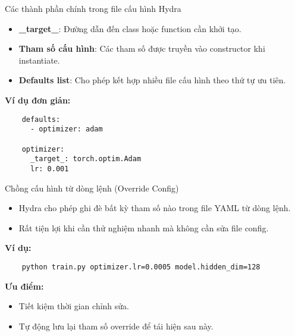 \documentclass{beamer}
\begin{document}
\begin{frame}[fragile]{Các thành phần chính trong file cấu hình Hydra}
    \begin{itemize}
        \item \textbf{\_target\_}: Đường dẫn đến class hoặc function cần khởi tạo.
        \item \textbf{Tham số cấu hình}: Các tham số được truyền vào constructor khi instantiate.
        \item \textbf{Defaults list}: Cho phép kết hợp nhiều file cấu hình theo thứ tự ưu tiên.
    \end{itemize}
    \pause
    \textbf{Ví dụ đơn giản:}
    \begin{verbatim}
    defaults:
      - optimizer: adam
    
    optimizer:
      _target_: torch.optim.Adam
      lr: 0.001
    \end{verbatim}
\end{frame}

\begin{frame}[fragile]{Chồng cấu hình từ dòng lệnh (Override Config)}
    \begin{itemize}
        \item Hydra cho phép ghi đè bất kỳ tham số nào trong file YAML từ dòng lệnh.
        \item Rất tiện lợi khi cần thử nghiệm nhanh mà không cần sửa file config.
    \end{itemize}
    \textbf{Ví dụ:}
    \begin{verbatim}
    python train.py optimizer.lr=0.0005 model.hidden_dim=128
    \end{verbatim}
    \textbf{Ưu điểm:}
    \begin{itemize}
        \item Tiết kiệm thời gian chỉnh sửa.
        \item Tự động lưu lại tham số override để tái hiện sau này.
    \end{itemize}
\end{frame}
    
    
\end{document}
